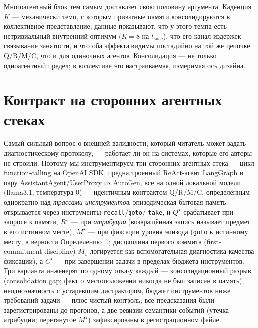 \documentclass{article}
\newcommand{\method}[1]{\texttt{#1}}
\begin{document}
Многоагентный блок тем самым доставляет свою половину аргумента.
Каденция $K$ --- механически темп, с которым приватные памяти
консолидируются в коллективное представление; данные показывают, что у этого темпа есть
нетривиальный внутренний оптимум ($K\!=\!8$ на $t_{\mathrm{succ}}$), что
его канал издержек --- связывание занятости, и что оба эффекта
видимы постадийно на той же цепочке Q/R/M/C, что и для одиночных
агентов. Консолидация --- не только одноагентный предел; в
коллективе это настраиваемая, измеримая ось дизайна.

\section{Контракт на сторонних агентных стеках}
\label{sec:external}

Самый сильный вопрос о внешней валидности, который читатель может задать
диагностическому протоколу, --- работает ли он на системах, которые его авторы не
строили. Поэтому мы инструментируем три сторонних агентных стека --- цикл
function-calling на OpenAI SDK, преднастроенный ReAct-агент
LangGraph и пару AssistantAgent/UserProxy из AutoGen, все на одной
локальной модели (llama3.1, температура $0$) --- идентичным
контрактом Q/R/M/C, определённым однократно над \emph{трассами инструментов}: эпизодическая
бытовая память открывается через инструменты \method{recall}/\method{goto}/%
\method{take}, и $Q^\star$ срабатывает при запросе к памяти, $R^\star$ ---
при \emph{атрибуции} (возвращённая запись называет предмет в его истинном
месте), $M^\star$ --- при фиксации уровня эпизода (\method{goto} к
истинному месту, в верности Определению~1; дисциплина первого коммита (first-commitment discipline)
$M_1$ логируется как вспомогательная диагностика качества фиксации), а
$C^\star$ --- при завершении задачи в пределах бюджета инструментов. Три варианта
инженерят по одному отказу каждый --- консолидационный разрыв (consolidation gap; факт о местоположении
никогда не был записан в память), неоднозначность с устаревшим дистрактором, бюджет
инструментов ниже требований задачи --- плюс чистый контроль; все
предсказания были зарегистрированы до прогонов, а две ревизии
семантики событий (утечка атрибуции; перетянутое $M^\star$)
зафиксированы в регистрационном файле.
\end{document}
